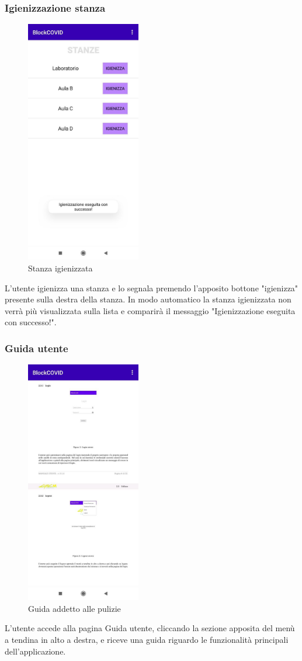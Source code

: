 	\subsubsection{Igienizzazione stanza}
	\begin{figure}[H]
		\centering
		\includegraphics[width=5cm]{res/images/igienizzazioneStanza.png}
		\caption{Stanza igienizzata}
	\end{figure}
	L'utente igienizza una stanza e lo segnala premendo l'apposito bottone "igienizza" presente sulla destra della stanza. In modo automatico la stanza igienizzata non verrà più visualizzata sulla lista e comparirà il messaggio "Igienizzazione eseguita con successo!".
	\subsubsection{Guida utente}
	\begin{figure}[H]
		\centering
		\includegraphics[width=5cm]{res/images/guidaAddetto.png}
		\caption{Guida addetto alle pulizie}
	\end{figure}
	L’utente accede alla pagina Guida utente, cliccando la sezione apposita del menù a tendina in alto a destra, e riceve una guida riguardo le funzionalità principali dell'applicazione.
	
	 
	
	
